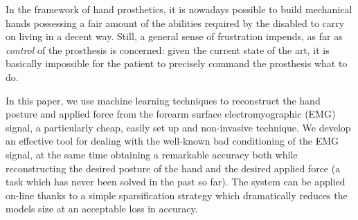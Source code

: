 In the framework of hand prosthetics, it is nowadays possible to build
mechanical hands possessing a fair amount of the abilities required by
the disabled to carry on living in a decent way. Still, a general
sense of frustration impends, as far as \emph{control} of the
prosthesis is concerned: given the current state of the art, it is
basically impossible for the patient to precisely command the
prosthesis what to do.

In this paper, we use machine learning techniques to reconstruct the
hand posture and applied force from the forearm surface
electromyographic (EMG) signal, a particularly cheap, easily set up
and non-invasive technique. We develop an effective tool for dealing
with the well-known bad conditioning of the EMG signal, at the same
time obtaining a remarkable accuracy both while reconstructing the
desired posture of the hand and the desired applied force (a task
which has never been solved in the past so far). The system can be
applied on-line thanks to a simple sparsification strategy which
dramatically reduces the models size at an acceptable loss in
accuracy.
